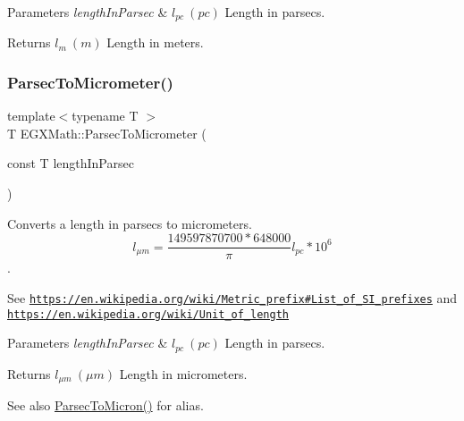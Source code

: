 \begin{DoxyParams}{Parameters}
{\em length\+In\+Parsec} & $ l_{pc}\ (pc)$ Length in parsecs. \\
\hline
\end{DoxyParams}
\begin{DoxyReturn}{Returns}
$ l_{m}\ (m)$ Length in meters. 
\end{DoxyReturn}
\mbox{\label{group___e_g_x_math-_conversions-_length_conversions-_astronomical-_parsec-_s_i_ga1eea34f6cb4b5a7b5dec1cd75863f191}} 
\subsubsection{\texorpdfstring{Parsec\+To\+Micrometer()}{ParsecToMicrometer()}}
{\footnotesize\ttfamily template$<$typename T $>$ \\
T E\+G\+X\+Math\+::\+Parsec\+To\+Micrometer (\begin{DoxyParamCaption}\item[{const T}]{length\+In\+Parsec }\end{DoxyParamCaption})}



Converts a length in parsecs to micrometers. \[ l_{\mu m}=\frac{149597870700 * 648000}{\pi}l_{pc} * 10^{6} \]. 

See \href{https://en.wikipedia.org/wiki/Metric_prefix#List_of_SI_prefixes}{\tt https\+://en.\+wikipedia.\+org/wiki/\+Metric\+\_\+prefix\#\+List\+\_\+of\+\_\+\+S\+I\+\_\+prefixes} and \href{https://en.wikipedia.org/wiki/Unit_of_length}{\tt https\+://en.\+wikipedia.\+org/wiki/\+Unit\+\_\+of\+\_\+length} 
\begin{DoxyParams}{Parameters}
{\em length\+In\+Parsec} & $ l_{pc}\ (pc)$ Length in parsecs. \\
\hline
\end{DoxyParams}
\begin{DoxyReturn}{Returns}
$ l_{\mu m}\ (\mu m)$ Length in micrometers. 
\end{DoxyReturn}
\begin{DoxySeeAlso}{See also}
\mbox{\hyperlink{group___e_g_x_math-_conversions-_length_conversions-_astronomical-_parsec-_non-_s_i_ga9460305baf1a39635da24198d888a91b}{Parsec\+To\+Micron()}} for alias. 
\end{DoxySeeAlso}
\mbox{\label{group___e_g_x_math-_conversions-_length_conversions-_astronomical-_parsec-_s_i_ga5ea5a5b0860b6c6ad260425079db2ee2}} 

